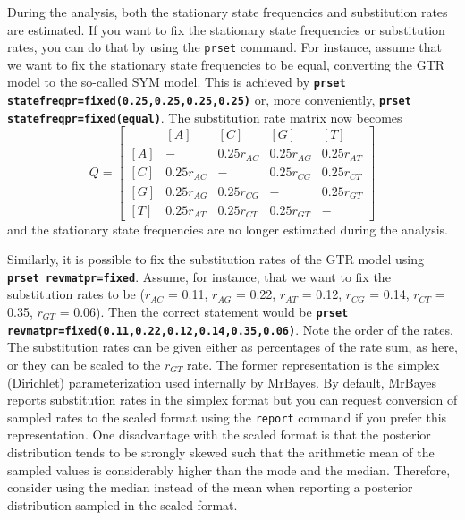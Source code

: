 \documentclass[12pt]{book}
\newcommand{\ttt}[1]{\texttt{#1}}
\newcommand{\tb}[1]{\ttt{\textbf{#1}}}
\begin{document}
During the analysis, both the stationary state frequencies and substitution rates are estimated. If
you want to fix the stationary state frequencies or substitution rates, you can do that by using
the \ttt{prset} command. For instance, assume that we want to fix the stationary state frequencies
to be equal, converting the GTR model to the so-called SYM model. This is achieved by \tb{prset
statefreqpr=fixed(0.25,0.25,0.25,0.25)} or, more conveniently, \tb{prset statefreqpr=fixed(equal)}.
The substitution rate matrix now becomes
\[ Q=\begin{bmatrix}
    & [A] & [C] & [G] & [T]\\
 [A]& - & 0.25 r_{AC} & 0.25 r_{AG} & 0.25 r_{AT}\\
 [C]& 0.25 r_{AC} & - & 0.25 r_{CG} &0.25 r_{CT}\\
 [G]& 0.25 r_{AG} & 0.25 r_{CG}& - & 0.25 r_{GT}\\
 [T]& 0.25 r_{AT} & 0.25 r_{CT}&0.25 r_{GT} & -
\end{bmatrix}
\]
and the stationary state frequencies are no longer estimated during the analysis.

Similarly, it is possible to fix the substitution rates of the GTR model using \tb{prset
revmatpr=fixed}. Assume, for instance, that we want to fix the substitution rates to be ($r_{AC}$ =
0.11, $r_{AG}$ = 0.22, $r_{AT}$ = 0.12, $r_{CG}$ = 0.14, $r_{CT}$ = 0.35, $r_{GT}$ = 0.06). Then
the correct statement would be \tb{prset revmatpr=fixed(0.11,0.22,0.12,0.14,0.35,0.06)}. Note the
order of the rates. The substitution rates can be given either as percentages of the rate sum, as
here, or they can be scaled to the $r_{GT}$ rate. The former representation is the simplex
(Dirichlet) parameterization used internally by MrBayes. By default, MrBayes reports substitution
rates in the simplex format but you can request conversion of sampled rates to the scaled format
using the \ttt{report} command if you prefer this representation. One disadvantage with the scaled
format is that the posterior distribution tends to be strongly skewed such that the arithmetic mean
of the sampled values is considerably higher than the mode and the median. Therefore, consider
using the median instead of the mean when reporting a posterior distribution sampled in the scaled
format.
\end{document}
